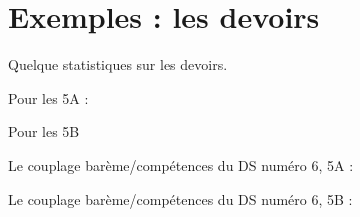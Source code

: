 

\section{Exemples : les devoirs}

Quelque statistiques sur les devoirs.

\vfill

Pour les 5A :


\begin{center}
   
\end{center}

\vfill

Pour les 5B

\begin{center}
   
\end{center}


Le couplage barème/compétences du DS numéro 6, 5A :

\begin{center}
   
\end{center}

Le couplage barème/compétences du DS numéro 6, 5B :

\begin{center}
   
\end{center}
